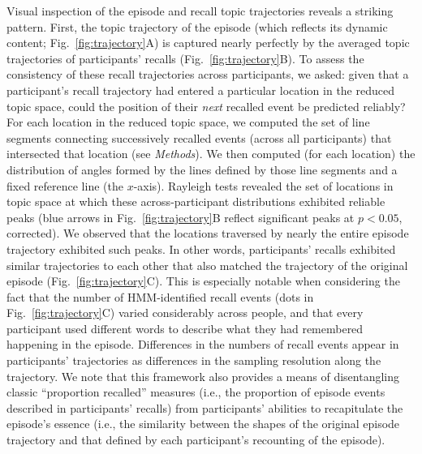 \documentclass[10pt]{article}
\begin{document}
Visual inspection of the episode and recall topic trajectories reveals a striking pattern.  First, the topic trajectory of the episode (which reflects its dynamic content; Fig.~\ref{fig:trajectory}A) is captured nearly perfectly by the averaged topic trajectories of participants' recalls (Fig.~\ref{fig:trajectory}B).  To assess the consistency of these recall trajectories across participants, we asked: given that a participant's recall trajectory had entered a particular location in the reduced topic space, could the position of their \textit{next} recalled event be predicted reliably?  For each location in the reduced topic space, we computed the set of line segments connecting successively recalled events (across all participants) that intersected that location (see \textit{Methods}).  We then computed (for each location) the distribution of angles formed by the lines defined by those line segments and a fixed reference line (the $x$-axis).  Rayleigh tests revealed the set of locations in topic space at which these across-participant distributions exhibited reliable peaks (blue arrows in Fig.~\ref{fig:trajectory}B reflect significant peaks at $p < 0.05$, corrected).  We observed that the locations traversed by nearly the entire episode trajectory exhibited such peaks.  In other words, participants' recalls exhibited similar trajectories to each other that also matched the trajectory of the original episode (Fig.~\ref{fig:trajectory}C).  This is especially notable when considering the fact that the number of HMM-identified recall events (dots in Fig.~\ref{fig:trajectory}C) varied considerably across people, and that every participant used different words to describe what they had remembered happening in the episode.  Differences in the numbers of recall events appear in participants' trajectories as differences in the sampling resolution along the trajectory.  We note that this framework also provides a means of disentangling classic ``proportion recalled'' measures (i.e., the proportion of episode events described in participants' recalls) from participants' abilities to recapitulate the episode's essence (i.e., the similarity between the shapes of the original episode trajectory and that defined by each participant's recounting of the episode).
\end{document}
